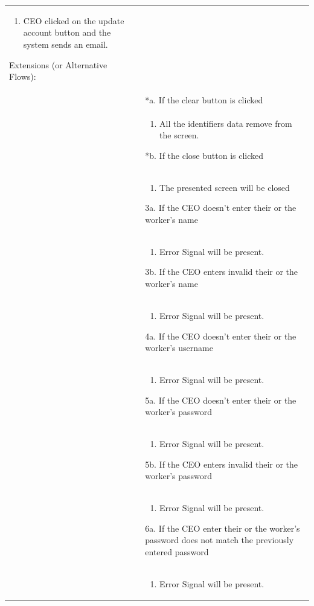 \documentclass[12pt,a4paper]{article}
\begin{document}
\begin{longtable}{| p{3cm}|p{12cm}|}
\begin{enumerate}
\item CEO clicked on the update account button and the system sends an email.
\end{enumerate}
Extensions (or Alternative Flows):\\
& *a. If the clear button is clicked \\
& \begin{enumerate}
		\item All the identifiers data remove from the screen.
	\end{enumerate}
*b. If the close button is clicked\\
&	\begin{enumerate}
		\item The presented screen will be closed
	\end{enumerate}
3a. If the CEO doesn't enter their or the worker's name \\ 	
&	\begin{enumerate}
		\item Error Signal will be present.
	\end{enumerate}
3b. If the CEO enters invalid their or the worker's name \\ 	
&	\begin{enumerate}
		\item Error Signal will be present.
	\end{enumerate}
4a. If the CEO doesn't enter their or the worker's username\\ 	
&	\begin{enumerate}
		\item Error Signal will be present.
	\end{enumerate}
5a. If the CEO doesn't enter their or the worker's password \\ 	
&	\begin{enumerate}
		\item Error Signal will be present.
	\end{enumerate}
5b. If the CEO enters invalid their or the worker's password \\ 	
&	\begin{enumerate}
		\item Error Signal will be present.
	\end{enumerate}
6a. If the CEO enter their or the worker's password does not match the previously entered password \\ 	
&	\begin{enumerate}
		\item Error Signal will be present.
	\end{enumerate}

\end{longtable}
\end{document}
